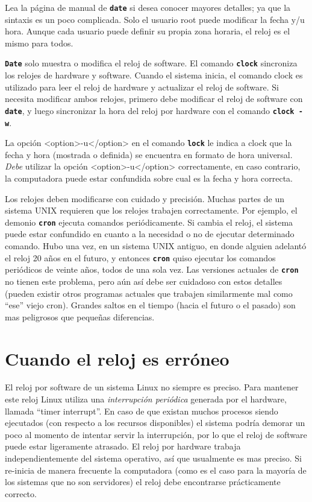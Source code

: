 \documentclass[12pt]{article}
\begin{document}
Lea la página de manual de \texttt{\textbf{date}} si desea conocer mayores detalles; ya que la sintaxis es un poco complicada.
Solo el usuario root puede modificar la fecha y/u hora. Aunque cada usuario puede definir su propia zona horaria,
el reloj es el mismo para todos.



\texttt{\textbf{Date}} solo muestra o modifica el reloj de software. El comando \texttt{\textbf{clock}} sincroniza los relojes de hardware y software.
Cuando el sistema inicia, el comando clock es utilizado para leer el reloj de hardware y actualizar
el reloj de software. Si necesita modificar ambos relojes, primero debe modificar el reloj de software con \texttt{\textbf{date}},
y luego sincronizar la hora del reloj por hardware con el comando \texttt{\textbf{clock -w}}.



La opción <option>-u</option> en el comando \texttt{\textbf{lock}} le indica a clock que la fecha y hora (mostrada o definida)
se encuentra en formato de hora universal. \textit{Debe} utilizar la opción <option>-u</option> correctamente, en
caso contrario, la computadora puede estar confundida sobre cual es la fecha y hora correcta.



Los relojes deben modificarse con cuidado y precisión.
Muchas partes de un sistema UNIX requieren que los relojes trabajen correctamente.
Por ejemplo, el demonio \texttt{\textbf{cron}} ejecuta comandos periódicamente. Si cambia el reloj, el sistema puede
estar confundido en cuanto a la necesidad o no de ejecutar determinado comando.
Hubo una vez, en un sistema UNIX antiguo, en donde alguien adelantó el reloj 20 años en el futuro, y
entonces \texttt{\textbf{cron}} quiso ejecutar
los comandos periódicos de veinte años, todos de una sola vez.
Las versiones actuales de \texttt{\textbf{cron}} no tienen este problema, pero aún así debe ser cuidadoso con estos
detalles (pueden existir otros programas actuales que trabajen similarmente mal como ``ese'' viejo cron).
Grandes saltos en el tiempo (hacia el futuro o el pasado) son mas peligrosos que pequeñas diferencias.




\section{Cuando el reloj es erróneo}


El reloj por software de un sistema Linux no siempre es preciso. Para mantener este reloj
Linux utiliza una \textit{interrupción periódica} generada por el hardware, llamada ``timer interrupt''.
En caso de que existan muchos procesos siendo ejecutados (con respecto a los recursos disponibles)
el sistema podría demorar un poco al momento de intentar servir la interrupción, por lo que 
el reloj de software puede estar ligeramente atrasado. El reloj por hardware trabaja
independientemente del sistema operativo, así que usualmente es mas preciso. 
Si re-inicia de manera frecuente la computadora (como es el caso para la mayoría de los
sistemas que no son servidores) el reloj debe encontrarse prácticamente correcto.
\end{document}
